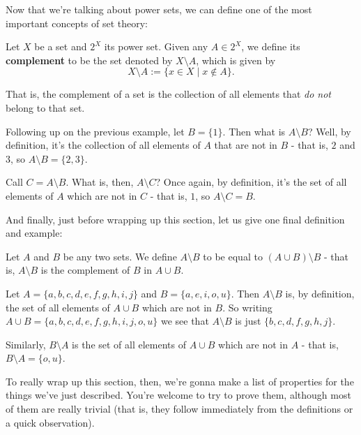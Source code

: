 Now that we're talking about power sets, we can define one of the most important concepts of set theory:

\begin{df}
	Let $X$ be a set and $2^X$ its power set. Given any $A\in 2^X$, we define its \textbf{complement} to be the set denoted by $X\setminus A$, which is given by\[X\setminus A:=\{x\in X\mid x\notin A\}.\]
\end{df}

That is, the complement of a set is the collection of all elements that \textit{do not} belong to that set.

\begin{ex}
	Following up on the previous example, let $B=\{1\}$. Then what is $A\setminus B$? Well, by definition, it's the collection of all elements of $A$ that are not in $B$ - that is, $2$ and $3$, so $A\setminus B=\{2,3\}$.
	
	Call $C=A\setminus B$. What is, then, $A\setminus C$? Once again, by definition, it's the set of all elements of $A$ which are not in $C$ - that is, $1$, so $A\setminus C=B$.
\end{ex}

And finally, just before wrapping up this section, let us give one final definition and example:

\begin{df}
	Let $A$ and $B$ be any two sets. We define $A\setminus B$ to be equal to $(A\cup B)\setminus B$ - that is, $A\setminus B$ is the complement of $B$ in $A\cup B$.
\end{df}
\begin{ex}
	Let $A=\{a,b,c,d,e,f,g,h,i,j\}$ and $B=\{a,e,i,o,u\}$. Then $A\setminus B$ is, by definition, the set of all elements of $A\cup B$ which are not in $B$. So writing $A\cup B=\{a,b,c,d,e,f,g,h,i,j,o,u\}$ we see that $A\setminus B$ is just $\{b,c,d,f,g,h,j\}$.
	
	Similarly, $B\setminus A$ is the set of all elements of $A\cup B$ which are not in $A$ - that is, $B\setminus A=\{o,u\}$.
\end{ex}

To really wrap up this section, then, we're gonna make a list of properties for the things we've just described. You're welcome to try to prove them, although most of them are really trivial (that is, they follow immediately from the definitions or a quick observation).

